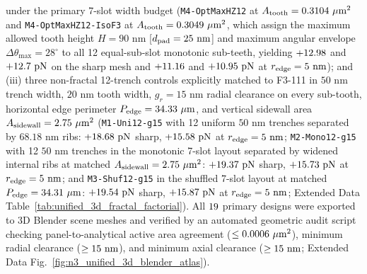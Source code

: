 \documentclass[pdflatex,sn-nature]{sn-jnl}
\DeclareRobustCommand{\roundtwo}[1]{\fpeval{round(#1,2)}}
\DeclareRobustCommand{\roundfour}[1]{\fpeval{round(#1,4)}}
\begin{document}
under the primary 7-slot width budget (\texttt{M4-OptMaxHZ12} at $A_{\rm tooth} = \roundfour{\NthreeOptMfourOptmaxhzonetwoAreaUmtwo}\ \mu\text{m}^2$ and \texttt{M4-OptMaxHZ12-IsoF3} at $A_{\rm tooth} = \roundfour{\NthreeOptMfourOptmaxhzonetwoIsofthreeAreaUmtwo}\ \mu\text{m}^2$, which assign the maximum allowed tooth height $H = 90\text{ nm}$ [$d_{\rm pad}=25\text{ nm}$] and maximum angular envelope $\Delta\theta_{\max}=28^\circ$ to all 12 equal-sub-slot monotonic sub-teeth, yielding $+\roundtwo{\NthreeOptMfourOptmaxhzonetwoFzPn}$ and $+\roundtwo{\NthreeOptMfourOptmaxhzonetwoIsofthreeFzPn}\text{ pN}$ on the sharp mesh and $+\roundtwo{\NthreeOptMfourOptmaxhzonetwoRfivenmFzPn}$ and $+\roundtwo{\NthreeOptMfourOptmaxhzonetwoIsofthreeRfivenmFzPn}\text{ pN}$ at $r_{\rm edge}=5\text{ nm}$); and (iii) three non-fractal 12-trench controls explicitly matched to F3-111 in $50\text{ nm}$ trench width, $20\text{ nm}$ tooth width, $g_r = 15\text{ nm}$ radial clearance on every sub-tooth, horizontal edge perimeter $P_{\rm edge} = \roundtwo{\NthreeOptMoneUnionetwoGonefivePedgeUm}\ \mu\text{m}$, and vertical sidewall area $A_{\rm sidewall} = \roundtwo{\NthreeOptMoneUnionetwoGonefiveAswUmtwo}\ \mu\text{m}^2$ (\texttt{M1-Uni12-g15} with 12 uniform $50\text{ nm}$ trenches separated by $68.18\text{ nm}$ ribs: $+\roundtwo{\NthreeOptMoneUnionetwoGonefiveFzPn}\text{ pN}$ sharp, $+\roundtwo{\NthreeOptMoneUnionetwoGonefiveRfivenmFzPn}\text{ pN}$ at $r_{\rm edge}=5\text{ nm}$; \texttt{M2-Mono12-g15} with 12 $50\text{ nm}$ trenches in the monotonic 7-slot layout separated by widened internal ribs at matched $A_{\rm sidewall} = \roundtwo{\NthreeOptMtwoMonoonetwoGonefiveAswUmtwo}\ \mu\text{m}^2$: $+\roundtwo{\NthreeOptMtwoMonoonetwoGonefiveFzPn}\text{ pN}$ sharp, $+\roundtwo{\NthreeOptMtwoMonoonetwoGonefiveRfivenmFzPn}\text{ pN}$ at $r_{\rm edge}=5\text{ nm}$; and \texttt{M3-Shuf12-g15} in the shuffled 7-slot layout at matched $P_{\rm edge} = \roundtwo{\NthreeOptMthreeShufonetwoGonefivePedgeUm}\ \mu\text{m}$: $+\roundtwo{\NthreeOptMthreeShufonetwoGonefiveFzPn}\text{ pN}$ sharp, $+\roundtwo{\NthreeOptMthreeShufonetwoGonefiveRfivenmFzPn}\text{ pN}$ at $r_{\rm edge}=5\text{ nm}$; Extended Data Table~\ref{tab:unified_3d_fractal_factorial}). All $19{}$ primary designs were exported to 3D Blender scene meshes and verified by an automated geometric audit script checking panel-to-analytical active area agreement ($\le \roundfour{\NthreeBlenderAuditMaxAreaErrUmtwo}\ \mu\text{m}^2$), minimum radial clearance ($\ge 15{}\text{ nm}$), and minimum axial clearance ($\ge 15{}\text{ nm}$; Extended Data Fig.~\ref{fig:n3_unified_3d_blender_atlas}).
\end{document}
